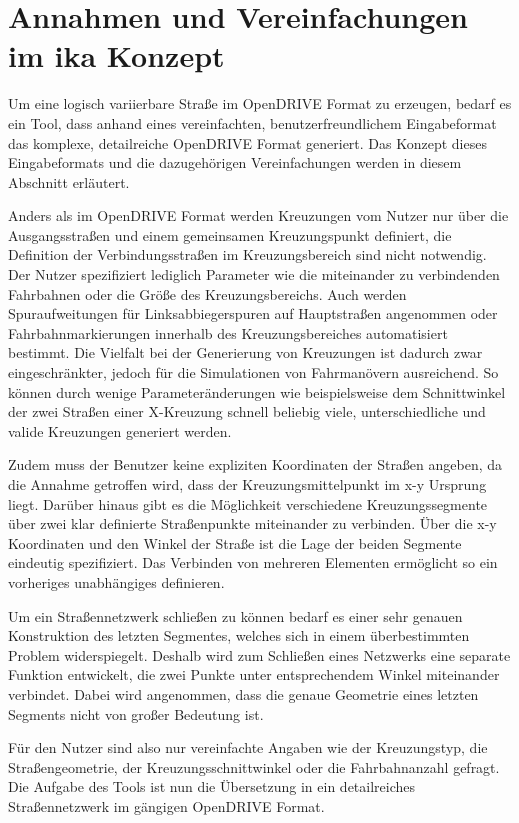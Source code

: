 \chapter{Annahmen und Vereinfachungen im ika Konzept}

Um eine logisch variierbare Straße im OpenDRIVE Format zu erzeugen, bedarf es ein Tool, dass anhand eines vereinfachten, benutzerfreundlichem Eingabeformat das komplexe, detailreiche OpenDRIVE Format generiert. Das Konzept dieses Eingabeformats und die dazugehörigen Vereinfachungen werden in diesem Abschnitt erläutert.

Anders als im OpenDRIVE Format werden Kreuzungen vom Nutzer nur über die Ausgangsstraßen und einem gemeinsamen Kreuzungspunkt definiert, die Definition der Verbindungsstraßen im Kreuzungsbereich sind nicht notwendig. Der Nutzer spezifiziert lediglich Parameter wie die miteinander zu verbindenden Fahrbahnen oder die Größe des Kreuzungsbereichs. Auch werden Spuraufweitungen für Linksabbiegerspuren auf Hauptstraßen angenommen oder Fahrbahnmarkierungen innerhalb des Kreuzungsbereiches automatisiert bestimmt. Die Vielfalt bei der Generierung von Kreuzungen ist dadurch zwar eingeschränkter, jedoch für die Simulationen von Fahrmanövern ausreichend. So können durch wenige Parameteränderungen wie beispielsweise dem Schnittwinkel der zwei Straßen einer X-Kreuzung schnell beliebig viele, unterschiedliche und valide Kreuzungen generiert werden.

Zudem muss der Benutzer keine expliziten Koordinaten der Straßen angeben, da die Annahme getroffen wird, dass der Kreuzungsmittelpunkt im x-y Ursprung liegt. Darüber hinaus gibt es die Möglichkeit verschiedene Kreuzungssegmente über zwei klar definierte Straßenpunkte miteinander zu verbinden. Über die x-y Koordinaten und den Winkel der Straße ist die Lage der beiden Segmente eindeutig spezifiziert. Das Verbinden von mehreren Elementen ermöglicht so ein vorheriges unabhängiges definieren.

Um ein Straßennetzwerk schließen zu können bedarf es einer sehr genauen Konstruktion des letzten Segmentes, welches sich in einem überbestimmten Problem widerspiegelt. Deshalb wird zum Schließen eines Netzwerks eine separate Funktion entwickelt, die zwei Punkte unter entsprechendem Winkel miteinander verbindet. Dabei wird angenommen, dass die genaue Geometrie eines letzten Segments nicht von großer Bedeutung ist.

Für den Nutzer sind also nur vereinfachte Angaben wie der Kreuzungstyp, die Straßengeometrie, der Kreuzungsschnittwinkel oder die Fahrbahnanzahl gefragt. Die Aufgabe des Tools ist nun die Übersetzung in ein detailreiches Straßennetzwerk im gängigen OpenDRIVE Format.

